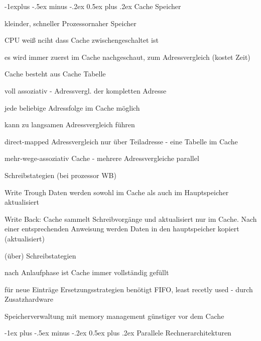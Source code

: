 \documentclass[10pt,landscape]{article}
\makeatletter
\renewcommand{\section}{\@startsection{section}{1}{0mm}%
                                {-1ex plus -.5ex minus -.2ex}%
                                {0.5ex plus .2ex}%
                                {\normalfont\large\bfseries}}
\renewcommand{\subsection}{\@startsection{subsection}{2}{0mm}%
                                {-1explus -.5ex minus -.2ex}%
                                {0.5ex plus .2ex}%
                                {\normalfont\normalsize\bfseries}}
\makeatother
\begin{document}
\begin{multicols}{3}
  \subsection{Cache Speicher}
  \begin{itemize*}
    \item kleinder, schneller Prozessornaher Speicher
    \item CPU weiß nciht dass Cache zwischengeschaltet ist
    \item es wird immer zuerst im Cache nachgeschaut, zum Adressvergleich (kostet Zeit)
    \item Cache besteht aus Cache Tabelle
    \begin{itemize*}
      \item voll assoziativ - Adressvergl. der kompletten Adresse
      \item jede beliebige Adressfolge im Cache möglich
      \item kann zu langsamen Adressvergleich führen
      \item direct-mapped Adressvergleich nur über Teiladresse - eine Tabelle im Cache
      \item mehr-wege-assoziativ Cache - mehrere Adressvergleiche parallel
    \end{itemize*}
    \item Schreibstategien (bei prozessor WB)
    \begin{itemize*}
      \item Write Trough Daten werden sowohl im Cache als auch im Hauptspeicher aktualisiert
      \item Write Back: Cache sammelt Schreibvorgänge und aktualisiert nur im Cache. Nach einer entsprechenden Anweisung werden Daten in den hauptspeicher kopiert (aktualisiert)
    \end{itemize*}
    \item (über) Schreibstategien
    \begin{itemize*}
      \item nach Anlaufphase ist Cache immer vollständig gefüllt
      \item für neue Einträge Ersetzungsstrategien benötigt FIFO, least recetly used - durch Zusatzhardware
    \end{itemize*}
    \item Speicherverwaltung mit memory management günstiger vor dem Cache
  \end{itemize*}
  
  \section{Parallele Rechnerarchitekturen}

\end{multicols}
\end{document}

